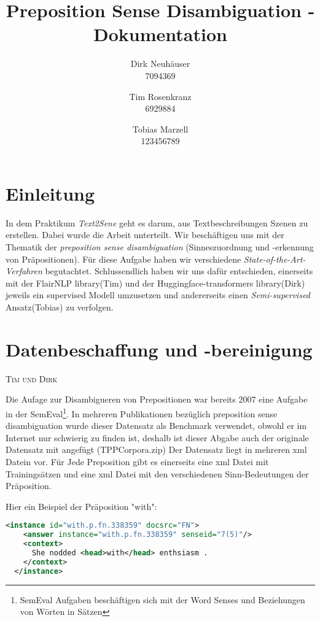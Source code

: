 \documentclass[10pt,a4paper]{article}
\newcommand{\chapterauthor}[1]{%
	{\parindent0pt\vspace*{-5pt}\hspace*{\fill}%
  \linespread{1.1}\large\scshape#1%
  \par\nobreak\vspace*{10pt}}
}
\begin{document}
\title{Preposition Sense Disambiguation - Dokumentation}
 
\author{
Dirk Neuhäuser \\ 7094369
\and
Tim Rosenkranz \\ 6929884
\and 
Tobias Marzell \\ 123456789
}

\maketitle
\tableofcontents

\section{Einleitung}
In dem Praktikum \textit{Text2Sene} geht es darum, aus Textbeschreibungen Szenen zu erstellen. Dabei wurde die Arbeit unterteilt. Wir beschäftigen uns mit der Thematik der \textit{preposition sense disambiguation} (Sinneszuordnung und -erkennung von Präpositionen). Für diese Aufgabe haben wir verschiedene \textit{State-of-the-Art-Verfahren} begutachtet. Schlussendlich haben wir uns dafür entschieden, einerseits mit der FlairNLP library(Tim) und der Huggingface-transformers library(Dirk) jeweils ein supervised Modell umzusetzen und andererseits einen \textit{Semi-supervised} Ansatz(Tobias) zu verfolgen.

\newpage

\section{Datenbeschaffung und -bereinigung}
\chapterauthor{Tim und Dirk}
Die Aufage zur Disambigueren von Prepositionen war bereits 2007 eine Aufgabe in der SemEval\footnote{SemEval Aufgaben beschäftigen sich mit der Word Senses und Beziehungen von Wörten in Sätzen}. In mehreren Publikationen bezüglich preposition sense disambiguation wurde dieser Datensatz als Benchmark verwendet, obwohl er im Internet nur schwierig zu finden ist, deshalb ist dieser Abgabe auch der originale Datensatz mit angefügt (TPPCorpora.zip)
Der Datensatz liegt in mehreren xml Datein vor. Für Jede Preposition gibt es einerseits eine xml Datei mit Trainingsätzen und eine xml Datei mit den verschiedenen Sinn-Bedeutungen der Präposition.

Hier ein Beispiel der Präposition "with": 

\begin{lstlisting}[language=xml]
  <instance id="with.p.fn.338359" docsrc="FN">
    <answer instance="with.p.fn.338359" senseid="7(5)"/>
    <context>
      She nodded <head>with</head> enthsiasm .
    </context>
  </instance>
\end{lstlisting}
\end{document}
